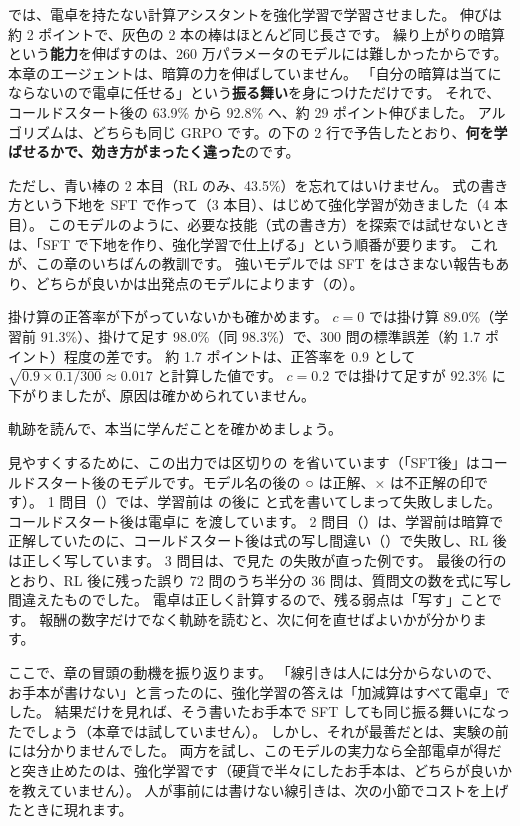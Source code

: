 では、電卓を持たない計算アシスタントを強化学習で学習させました。
伸びは約 2 ポイントで、灰色の 2 本の棒はほとんど同じ長さです。
繰り上がりの暗算という\textbf{能力}を伸ばすのは、260 万パラメータのモデルには難しかったからです。
本章のエージェントは、暗算の力を伸ばしていません。
「自分の暗算は当てにならないので電卓に任せる」という\textbf{振る舞い}を身につけただけです。
それで、コールドスタート後の 63.9\% から 92.8\% へ、約 29 ポイント伸びました。
アルゴリズムは、どちらも同じ GRPO です。の下の 2 行で予告したとおり、\textbf{何を学ばせるかで、効き方がまったく違った}のです。

ただし、青い棒の 2 本目（RL のみ、43.5\%）を忘れてはいけません。
式の書き方という下地を SFT で作って（3 本目）、はじめて強化学習が効きました（4 本目）。
このモデルのように、必要な技能（式の書き方）を探索では試せないときは、「SFT で下地を作り、強化学習で仕上げる」という順番が要ります。
これが、この章のいちばんの教訓です。
強いモデルでは SFT をはさまない報告もあり、どちらが良いかは出発点のモデルによります（の）。

掛け算の正答率が下がっていないかも確かめます。
$c=0$ では掛け算 89.0\%（学習前 91.3\%）、掛けて足す 98.0\%（同 98.3\%）で、300 問の標準誤差（約 1.7 ポイント）程度の差です。
約 1.7 ポイントは、正答率を 0.9 として $\sqrt{0.9\times0.1/300}\approx0.017$ と計算した値です。
$c=0.2$ では掛けて足すが 92.3\% に下がりましたが、原因は確かめられていません。

軌跡を読んで、本当に学んだことを確かめましょう。


見やすくするために、この出力では区切りの  を省いています（「SFT後」はコールドスタート後のモデルです。モデル名の後の ○ は正解、× は不正解の印です）。
1 問目（）では、学習前は  の後に  と式を書いてしまって失敗しました。
コールドスタート後は電卓に  を渡しています。
2 問目（）は、学習前は暗算で正解していたのに、コールドスタート後は式の写し間違い（）で失敗し、RL 後は正しく写しています。
3 問目は、で見た  の失敗が直った例です。
最後の行のとおり、RL 後に残った誤り 72 問のうち半分の 36 問は、質問文の数を式に写し間違えたものでした。
電卓は正しく計算するので、残る弱点は「写す」ことです。
報酬の数字だけでなく軌跡を読むと、次に何を直せばよいかが分かります。

ここで、章の冒頭の動機を振り返ります。
「線引きは人には分からないので、お手本が書けない」と言ったのに、強化学習の答えは「加減算はすべて電卓」でした。
結果だけを見れば、そう書いたお手本で SFT しても同じ振る舞いになったでしょう（本章では試していません）。
しかし、それが最善だとは、実験の前には分かりませんでした。
両方を試し、このモデルの実力なら全部電卓が得だと突き止めたのは、強化学習です（硬貨で半々にしたお手本は、どちらが良いかを教えていません）。
人が事前には書けない線引きは、次の小節でコストを上げたときに現れます。

